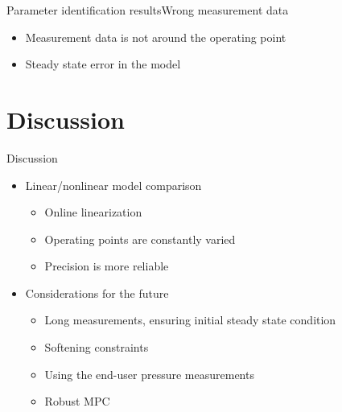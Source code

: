 \begin{frame}{Parameter identification results}{Wrong measurement data}

\begin{itemize}
	 	\item<1-> Measurement data is not around the operating point
	 	\item<1-> Steady state error in the model
	 	\end{itemize}

\begin{figure}[H]
   \centering
    
\end{figure}

\begin{figure}[H]
   \centering
    
\end{figure}

\end{frame}


\section{Discussion}
\begin{frame}{Discussion}{}

\begin{itemize}
	\item<1->Linear/nonlinear model comparison
	\begin{itemize}
	 \item<1-> Online linearization
	 \item<1-> Operating points are constantly varied
	 \item<1-> Precision is more reliable

	\end{itemize}
\end{itemize}

\begin{itemize}
\item<2-> Considerations for the future
	 \begin{itemize}
	 \item<2-> Long measurements, ensuring initial steady state condition
	 \item<2-> Softening constraints
	 \item<2-> Using the end-user pressure measurements
	 \item<2-> Robust MPC
	 \end{itemize}
\end{itemize}

\end{frame}
